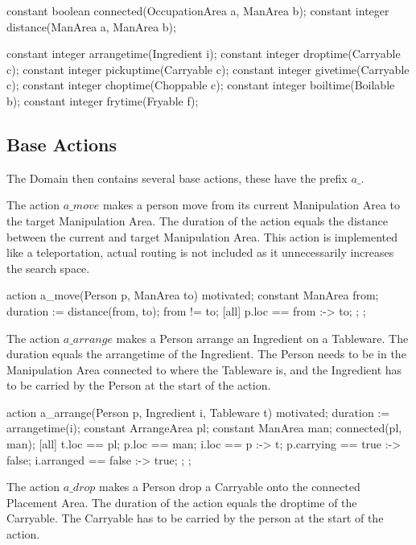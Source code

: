 \begin{anmlcode}
constant boolean connected(OccupationArea a, ManArea b);
constant integer distance(ManArea a, ManArea b);

constant integer arrangetime(Ingredient i);
constant integer droptime(Carryable c);
constant integer pickuptime(Carryable c);
constant integer givetime(Carryable c);
constant integer choptime(Choppable c);
constant integer boiltime(Boilable b);
constant integer frytime(Fryable f);
\end{anmlcode}


\subsection{Base Actions}
The Domain then contains several base actions, these have the prefix $a\_$.

The action $a\_move$ makes a person move from its current Manipulation Area to the target Manipulation Area.
The duration of the action equals the distance between the current and target Manipulation Area.
This action is implemented like a teleportation, actual routing is not included as it unnecessarily increases the search space.

\begin{anmlcode}
action a_move(Person p, ManArea to) {
  motivated;
  constant ManArea from;
  duration := distance(from, to);
  from != to;
  [all] {
    p.loc == from :-> to;
  };
};
\end{anmlcode}

The action $a\_arrange$ makes a Person arrange an Ingredient on a Tableware.
The duration equals the arrangetime of the Ingredient.
The Person needs to be in the Manipulation Area connected to where the Tableware is, and the Ingredient has to be carried by the Person at the start of the action.

\begin{anmlcode}
action a_arrange(Person p, Ingredient i, Tableware t) {
  motivated;
  duration := arrangetime(i);
  constant ArrangeArea pl;
  constant ManArea man;
  connected(pl, man);
  [all] {
    t.loc == pl;
    p.loc == man;
    i.loc == p :-> t;
    p.carrying == true :-> false;
    i.arranged == false :-> true;
  };
};
\end{anmlcode}

The action $a\_drop$ makes a Person drop a Carryable onto the connected Placement Area.
The duration of the action equals the droptime of the Carryable.
The Carryable has to be carried by the person at the start of the action.

